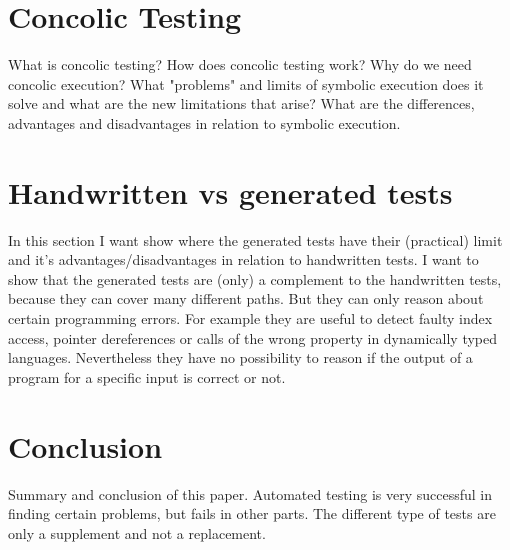 \documentclass[journal]{IEEEtran}
\begin{document}
\section{Concolic Testing}
What is concolic testing? How does concolic testing work? Why do we need concolic execution? What "problems" and limits of symbolic execution does it solve and what are the new limitations that arise?
What are the differences, advantages and disadvantages in relation to symbolic execution.
\cite{Cadar:2006:EAG:1180405.1180445}
\cite{Cadar:2008:KUA:1855741.1855756}
\cite{Cadar:2013:SES:2408776.2408795}
\cite{Godefroid:2005:DDA:1064978.1065036}
\cite{Godefroid:2012:SWF:2090147.2094081}
\section{Handwritten vs generated tests}
In this section I want show where the generated tests have their (practical) limit and it's advantages/disadvantages in relation to handwritten tests.
I want to show that the generated tests are (only) a complement to the handwritten tests, because they can cover many different paths. But they can only reason about certain programming errors. For example they are useful to detect faulty index access, pointer dereferences or calls of the wrong property in dynamically typed languages. Nevertheless they have no possibility to reason if the output of a program for a specific input is correct or not.
\section{Conclusion}
Summary and conclusion of this paper. 
Automated testing is very successful in finding certain problems, but fails in other parts.
The different type of tests are only a supplement and not a replacement.


\end{document}
